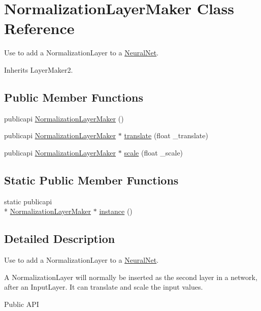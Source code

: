 \hypertarget{classNormalizationLayerMaker}{\section{Normalization\-Layer\-Maker Class Reference}
\label{classNormalizationLayerMaker}
}


Use to add a Normalization\-Layer to a \hyperlink{classNeuralNet}{Neural\-Net}.  




Inherits Layer\-Maker2.

\subsection*{Public Member Functions}
\begin{DoxyCompactItemize}
\item 
publicapi \hyperlink{classNormalizationLayerMaker_a763386829f0431cccb5d5eedec5876f6}{Normalization\-Layer\-Maker} ()
\item 
publicapi \hyperlink{classNormalizationLayerMaker}{Normalization\-Layer\-Maker} $\ast$ \hyperlink{classNormalizationLayerMaker_a066b06f1db1da8c261e16c72839a9ad5}{translate} (float \-\_\-translate)
\item 
publicapi \hyperlink{classNormalizationLayerMaker}{Normalization\-Layer\-Maker} $\ast$ \hyperlink{classNormalizationLayerMaker_a9340f7041aa367dbfa3ef5ebf3bbb100}{scale} (float \-\_\-scale)
\end{DoxyCompactItemize}
\subsection*{Static Public Member Functions}
\begin{DoxyCompactItemize}
\item 
static publicapi \\*
\hyperlink{classNormalizationLayerMaker}{Normalization\-Layer\-Maker} $\ast$ \hyperlink{classNormalizationLayerMaker_a2111256b400f82bdeebade32e23da5c0}{instance} ()
\end{DoxyCompactItemize}


\subsection{Detailed Description}
Use to add a Normalization\-Layer to a \hyperlink{classNeuralNet}{Neural\-Net}. 

A Normalization\-Layer will normally be inserted as the second layer in a network, after an Input\-Layer. It can translate and scale the input values. \begin{DoxyParagraph}{Public A\-P\-I}

\end{DoxyParagraph}


